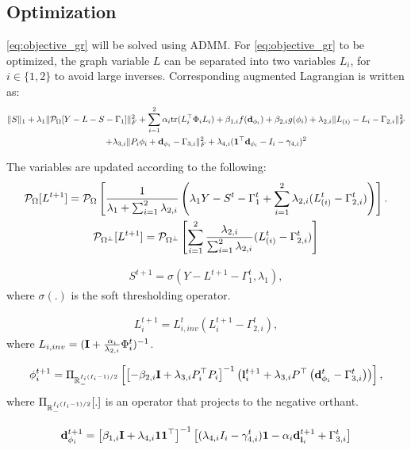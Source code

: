 \documentclass{article}
\begin{document}
\subsection{Optimization}
\eqref{eq:objective_gr} will be solved using ADMM. For \eqref{eq:objective_gr} to be optimized, the graph variable $L$ can be separated into two variables $L_i$, for $i\in\{1,2\}$ to avoid large inverses. Corresponding augmented Lagrangian is written as:
\begin{gather}
    \|S\|_1+\lambda_1\|\P_{\Omega}[Y - L - S-\Gamma_1]\|_F^2 + \sum_{i=1}^2\alpha_{i}\mathrm{tr}(L_{i}^\top \Phi_i L_{i}) + \beta_{1,i}f(\d_{\phi_i})+\beta_{2,i}g(\phi_i)+\lambda_{2,i}\|L_{(i)}-L_i-\Gamma_{2,i}\|_F^2\nonumber\\
    + \lambda_{3,i}\|P_i\phi_{i}+\d_{\phi_i}-\Gamma_{3,i}\|_F^2+ \lambda_{4,i}(\mathbf{1}^\top \d_{\phi_i}-I_i-\gamma_{4,i})^2
\end{gather}

The variables are updated according to the following:
\begin{gather}
    \P_{\Omega}[L^{t+1}] = \P_{\Omega}\left[\frac{1}{\lambda_1+\sum_{i=1}^2\lambda_{2,i}} \left( \lambda_1Y-S^t-\Gamma_1^t+\sum_{i=1}^2\lambda_{2,i}(L_{(i)}^t-\Gamma_{2,i}^t)\right)\right]. \\
    \P_{\Omega^\perp}[L^{t+1}] = \P_{\Omega^\perp}\left[\sum_{i=1}^2\frac{\lambda_{2,i}}{\sum_{i=1}^2\lambda_{2,i}}(L_{(i)}^t-\Gamma_{2,i}^t)\right]
\end{gather}

\begin{gather}
    S^{t+1} = \sigma(Y-L^{t+1}-\Gamma_1^t, \lambda_1),
\end{gather}
where $\sigma(.)$ is the soft thresholding operator.

\begin{gather}
    L_i^{t+1} = L_{i,inv}^t(L_i^{t+1}-\Gamma_{2,i}^t),
\end{gather}
where $L_{i,inv} = (\I+\frac{\alpha_i}{\lambda_{2,i}}\Phi_i^t)^{-1}$.


\begin{gather}
    \phi_i^{t+1} = \Pi_{\R^{I_i(I_i-1)/2}_{-}}\left[ \left[-\beta_{2,i}\I+\lambda_{3,i}P_{i}^\top P_i\right]^{-1}\left(\l_i^{t+1}+\lambda_{3,i}P^\top\left(\d_{\phi_i}^t-\Gamma_{3,i}^t\right)\right) \right],
\end{gather}
where $\Pi_{\R^{I_i(I_i-1)/2}_{-}}[.]$ is an operator that projects to the negative orthant.

\begin{gather}
    \d_{\phi_i}^{t+1} = \left[\beta_{1,i}\I+\lambda_{4,i}\mathbf{1}\mathbf{1}^\top\right]^{-1}\left[(\lambda_{4,i}I_i-\gamma_{4,i}^t)\mathbf{1}-\alpha_{i}\d_{\l_i}^{t+1}+\Gamma_{3,i}^t\right]
\end{gather}
\end{document}
